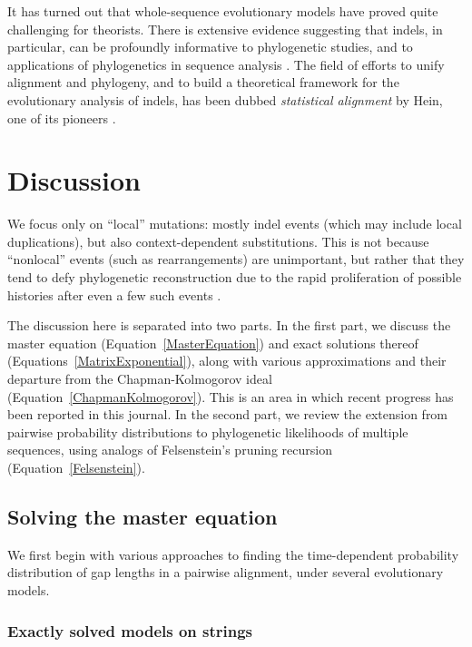 \documentclass{bmcart}
\newcommand{\eqref}[1]{Equation~\ref{#1}}
\begin{document}
It has turned out that whole-sequence evolutionary models have proved quite challenging for theorists.
There is extensive evidence suggesting that indels, in particular, can be profoundly informative to phylogenetic studies,
and to applications of phylogenetics in sequence analysis \cite{pmid8445636,pmid15276848,pmid18578882,pmid23475937,pmid19958081,pmid16354754}.
The field of efforts to unify alignment and phylogeny,
and to build a theoretical framework for the evolutionary analysis of indels,
has been dubbed
{\em statistical alignment} by Hein, one of its pioneers \cite{HeinEtal2000}.

\section*{Discussion}

We focus only on ``local'' mutations: mostly indel events (which may include local duplications),
but also context-dependent substitutions.
This is not because ``nonlocal'' events (such as rearrangements) are unimportant,
but rather that they tend to defy phylogenetic reconstruction due to the rapid proliferation of possible histories
after even a few such events \cite{pmid9773350}.

The discussion here is separated into two parts.
In the first part, we discuss
the master equation (\eqref{MasterEquation})
and exact solutions thereof (Equations~\ref{MatrixExponential}),
along with various approximations and their departure from the Chapman-Kolmogorov ideal (\eqref{ChapmanKolmogorov}).
This is an area in which recent progress has been reported in this journal.
In the second part, we review
the extension from pairwise probability distributions
to phylogenetic likelihoods of multiple sequences,
using analogs of Felsenstein's pruning recursion (\eqref{Felsenstein}).

\subsection*{Solving the master equation}

We first begin with various approaches to finding the time-dependent probability distribution
of gap lengths in a pairwise alignment,
under several evolutionary models.

\subsubsection*{Exactly solved models on strings}
\end{document}
